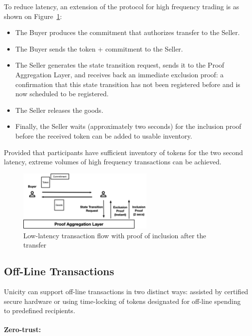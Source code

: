 \documentclass{article}
\begin{document}
To reduce latency, an extension of the protocol for high frequency trading is as shown on Figure~\ref{fig:LowLatency2}:
\begin{itemize}
  \item The Buyer produces the commitment that authorizes transfer to the Seller.
  \item The Buyer sends the token + commitment to the Seller.
  \item The Seller generates the state transition request, sends it to the Proof Aggregation Layer, and receives back an immediate exclusion proof: a confirmation that this state transition has not been registered before and is now scheduled to be registered.
  \item The Seller releases the goods.
  \item Finally, the Seller waits (approximately two seconds) for the inclusion proof before the received token can be added to usable inventory.
\end{itemize}

Provided that participants have sufficient inventory of tokens for the two second latency, extreme volumes of high frequency transactions can be achieved.

\begin{figure}[ht]
    \centering
    \includegraphics[width=0.6\textwidth]{Transaction2.png}
    \caption{Low-latency transaction flow with proof of inclusion after the transfer}
    \label{fig:LowLatency2}
\end{figure}

\subsection{Off-Line Transactions}

Unicity can support off-line transactions in two distinct ways: assisted by certified secure hardware or using time-locking of tokens designated for off-line spending to predefined recipients.

\paragraph{Zero-trust:}
\end{document}
